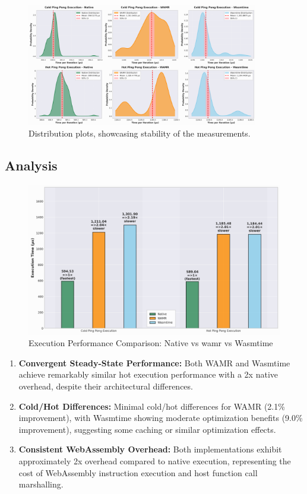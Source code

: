 \begin{figure}[h]
    \centering
    \includegraphics[width=0.9\textwidth]{images/execution-distribution}
    \caption{Distribution plots, showcasing stability of the measurements.}
    \label{fig:wasm-setup-distribution}
\end{figure}

\subsection{Analysis}

\begin{figure}[h]
    \centering
    \includegraphics[width=1.0\textwidth]{images/wasm-execution-rel}
    \caption{Execution Performance Comparison: Native vs \acrshort{wamr} vs Wasmtime}
    \label{fig:wasm-execution-relative}
\end{figure}

\begin{enumerate}
    \item \textbf{Convergent Steady-State Performance:} Both WAMR and Wasmtime achieve remarkably similar hot execution performance with a 2x native overhead, despite their architectural differences.
    
    \item \textbf{Cold/Hot Differences:} Minimal cold/hot differences for WAMR (2.1\% improvement), with Wasmtime showing moderate optimization benefits (9.0\% improvement), suggesting some caching or similar optimization effects.
    
    \item \textbf{Consistent WebAssembly Overhead:} Both implementations exhibit approximately 2x overhead compared to native execution, representing the cost of WebAssembly instruction execution and host function call marshalling.
\end{enumerate}

